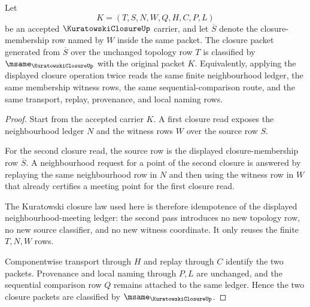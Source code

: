 \begin{theorem}
\label{thm:kuratowski-closure-idempotence}
Let
$$
K=(T,S,N,W,Q,H,C,P,L)
$$
be an accepted $\KuratowskiClosureUp$ carrier, and let $\overline{S}$ denote the closure-membership row named by $W$ inside the same packet. The closure packet generated from $\overline{S}$ over the unchanged topology row $T$ is classified by $\msame_{\KuratowskiClosureUp}$ with the original packet $K$. Equivalently, applying the displayed closure operation twice reads the same finite neighbourhood ledger, the same membership witness rows, the same sequential-comparison route, and the same transport, replay, provenance, and local naming rows.
\end{theorem}
\begin{proof}
Start from the accepted carrier $K$. A first closure read exposes the neighbourhood ledger $N$ and the witness rows $W$ over the source row $S$.

For the second closure read, the source row is the displayed closure-membership row $\overline{S}$. A neighbourhood request for a point of the second closure is answered by replaying the same neighbourhood row in $N$ and then using the witness row in $W$ that already certifies a meeting point for the first closure read.

The Kuratowski closure law used here is therefore idempotence of the displayed neighbourhood-meeting ledger: the second pass introduces no new topology row, no new source classifier, and no new witness coordinate. It only reuses the finite $T,N,W$ rows.

Componentwise transport through $H$ and replay through $C$ identify the two packets. Provenance and local naming through $P,L$ are unchanged, and the sequential comparison row $Q$ remains attached to the same ledger. Hence the two closure packets are classified by $\msame_{\KuratowskiClosureUp}$.
\end{proof}


